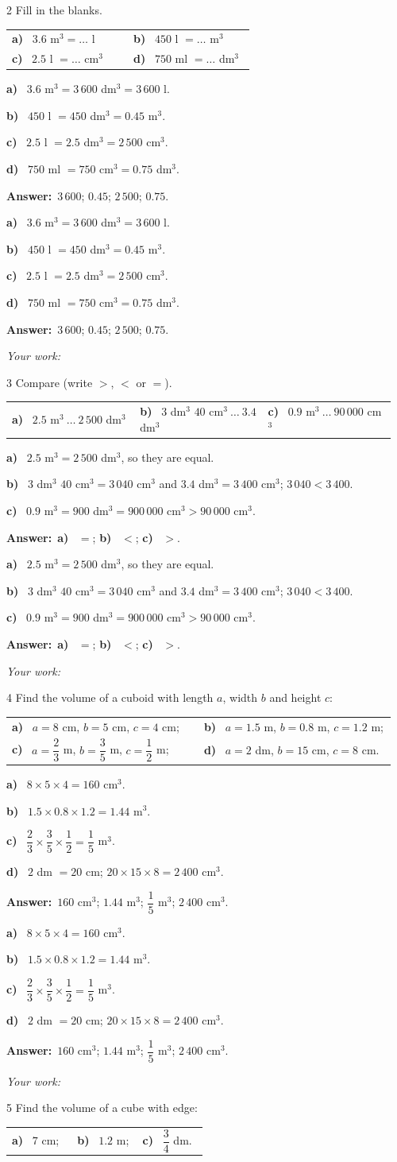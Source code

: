 \documentclass[11pt]{article}
\makeatletter
\newif\ifsol \soltrue
\renewcommand{\arraystretch}{1.35}
\providecommand{\AnsWord}{Đáp số}
\newcommand{\dapso}[1]{\par\textbf{\AnsWord:}\ #1}
\newcommand{\probsol}[1]{%
  \begin{lrbox}{\solmeasure}\begin{minipage}{\dimexpr\linewidth-24pt\relax}#1\end{minipage}\end{lrbox}%
  \ifsol
    \begin{solbox}#1\end{solbox}%
  \else
    \setlength{\solht}{\dimexpr\ht\solmeasure+\dp\solmeasure+0.85cm\relax}%
    \ifdim\solht<1.35cm\setlength{\solht}{1.35cm}\fi
    \begin{tcolorbox}[colback=white,colframe=Line,boxrule=0.8pt,arc=5pt,
      left=8pt,right=8pt,top=4pt,bottom=4pt,height=\solht]{\footnotesize\color{Slate}\itshape\WorkWord}\end{tcolorbox}%
  \fi}
\newcommand{\pa}[1]{\textbf{#1)}\ }
\newenvironment{cols2}{\par\vspace{3pt}\noindent\setlength{\tabcolsep}{0pt}\renewcommand{\arraystretch}{1.3}%
  \begin{tabular}{@{}>{\raggedright\arraybackslash\rule{0pt}{4.4ex}}p{0.48\linewidth}<{\rule[-2.3ex]{0pt}{0pt}}@{\hspace{0.03\linewidth}}>{\raggedright\arraybackslash\rule{0pt}{4.4ex}}p{0.48\linewidth}<{\rule[-2.3ex]{0pt}{0pt}}@{}}}%
  {\end{tabular}\par}
\newenvironment{cols3}{\par\vspace{3pt}\noindent\setlength{\tabcolsep}{0pt}\renewcommand{\arraystretch}{1.3}%
  \begin{tabular}{@{}>{\raggedright\arraybackslash\rule{0pt}{4.4ex}}p{0.32\linewidth}<{\rule[-2.3ex]{0pt}{0pt}}@{\hspace{0.015\linewidth}}>{\raggedright\arraybackslash\rule{0pt}{4.4ex}}p{0.32\linewidth}<{\rule[-2.3ex]{0pt}{0pt}}@{\hspace{0.015\linewidth}}>{\raggedright\arraybackslash\rule{0pt}{4.4ex}}p{0.32\linewidth}<{\rule[-2.3ex]{0pt}{0pt}}@{}}}%
  {\end{tabular}\par}
\newcommand{\gap}{\vspace{0.3cm}}
\def\WorkWord{Your work:}
\def\AnsWord{Answer}
\makeatother
\begin{document}
\gap
\begin{probbox}{2}{\relax}
Fill in the blanks.
\begin{cols2}
\pa{a} $3.6$ m$^3=\ldots$ l & \pa{b} $450$ l $=\ldots$ m$^3$\\
\pa{c} $2.5$ l $=\ldots$ cm$^3$ & \pa{d} $750$ ml $=\ldots$ dm$^3$
\end{cols2}
\end{probbox}
\probsol{
\pa{a} $3.6$ m$^3=3\,600$ dm$^3=3\,600$ l.\par
\pa{b} $450$ l $=450$ dm$^3=0.45$ m$^3$.\par
\pa{c} $2.5$ l $=2.5$ dm$^3=2\,500$ cm$^3$.\par
\pa{d} $750$ ml $=750$ cm$^3=0.75$ dm$^3$.
\dapso{$3\,600$; $0.45$; $2\,500$; $0.75$.}}
\gap
\begin{probbox}{3}{\relax}
Compare (write $>$, $<$ or $=$).
\begin{cols3}
\pa{a} $2.5$ m$^3\ \ldots\ 2\,500$ dm$^3$ & \pa{b} $3$ dm$^3$ $40$ cm$^3\ \ldots\ 3.4$ dm$^3$ & \pa{c} $0.9$ m$^3\ \ldots\ 90\,000$ cm$^3$
\end{cols3}
\end{probbox}
\probsol{
\pa{a} $2.5$ m$^3=2\,500$ dm$^3$, so they are equal.\par
\pa{b} $3$ dm$^3$ $40$ cm$^3=3\,040$ cm$^3$ and $3.4$ dm$^3=3\,400$ cm$^3$; $3\,040<3\,400$.\par
\pa{c} $0.9$ m$^3=900$ dm$^3=900\,000$ cm$^3>90\,000$ cm$^3$.
\dapso{\pa{a} $=$; \pa{b} $<$; \pa{c} $>$.}}
\gap
\begin{probbox}{4}{\relax}
Find the volume of a cuboid with length $a$, width $b$ and height $c$:
\begin{cols2}
\pa{a} $a=8$ cm, $b=5$ cm, $c=4$ cm; & \pa{b} $a=1.5$ m, $b=0.8$ m, $c=1.2$ m;\\
\pa{c} $a=\dfrac23$ m, $b=\dfrac35$ m, $c=\dfrac12$ m; & \pa{d} $a=2$ dm, $b=15$ cm, $c=8$ cm.
\end{cols2}
\end{probbox}
\probsol{
\pa{a} $8\times5\times4=160$ cm$^3$.\par
\pa{b} $1.5\times0.8\times1.2=1.44$ m$^3$.\par
\pa{c} $\dfrac23\times\dfrac35\times\dfrac12=\dfrac15$ m$^3$.\par
\pa{d} $2$ dm $=20$ cm; $20\times15\times8=2\,400$ cm$^3$.
\dapso{$160$ cm$^3$; $1.44$ m$^3$; $\dfrac15$ m$^3$; $2\,400$ cm$^3$.}}
\gap
\begin{probbox}{5}{\relax}
Find the volume of a cube with edge:
\begin{cols3}
\pa{a} $7$ cm; & \pa{b} $1.2$ m; & \pa{c} $\dfrac34$ dm.
\end{cols3}
\end{probbox}
\end{document}
